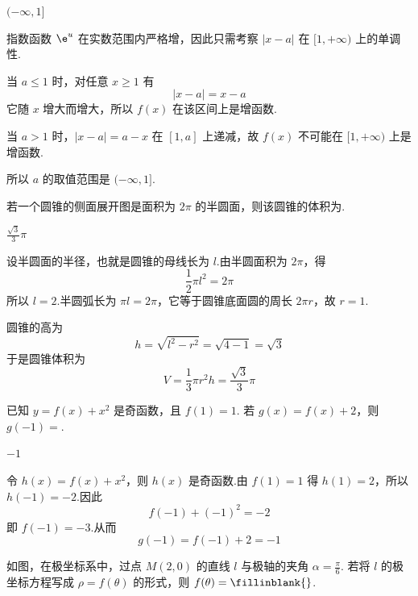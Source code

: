\begin{answer}
\((-\infty,1]\)
\end{answer}

\begin{solution}
指数函数 \(\e^u\) 在实数范围内严格增，因此只需考察 \(|x-a|\) 在 \([1,+\infty)\) 上的单调性.

当 \(a\leqslant1\) 时，对任意 \(x\geqslant1\) 有
\[
|x-a|=x-a
\]
它随 \(x\) 增大而增大，所以 \(f(x)\) 在该区间上是增函数.

当 \(a>1\) 时，\(|x-a|=a-x\) 在 \([1,a]\) 上递减，故 \(f(x)\) 不可能在 \([1,+\infty)\) 上是增函数.

所以 \(a\) 的取值范围是 \((-\infty,1]\).
\end{solution}

\begin{problem}
若一个圆锥的侧面展开图是面积为 \(2\pi\) 的半圆面，则该圆锥的体积为\fillinblank{}.
\end{problem}

\begin{answer}
\(\frac{\sqrt{3}}{3}\pi\)
\end{answer}

\begin{solution}
设半圆面的半径，也就是圆锥的母线长为 \(l\).由半圆面积为 \(2\pi\)，得
\[
\frac12\pi l^2=2\pi
\]
所以 \(l=2\).半圆弧长为 \(\pi l=2\pi\)，它等于圆锥底面圆的周长 \(2\pi r\)，故 \(r=1\).

圆锥的高为
\[
h=\sqrt{l^2-r^2}=\sqrt{4-1}=\sqrt3
\]
于是圆锥体积为
\[
V=\frac13\pi r^2h=\frac{\sqrt3}{3}\pi
\]
\end{solution}

\begin{problem}
已知 \( y = f(x) + x^2 \) 是奇函数，且 \( f(1) = 1 \). 若 \( g(x) = f(x) + 2 \)，则 \( g(-1) = \)\fillinblank{}.
\end{problem}

\begin{answer}
\(-1\)
\end{answer}

\begin{solution}
令 \(h(x)=f(x)+x^2\)，则 \(h(x)\) 是奇函数.由 \(f(1)=1\) 得 \(h(1)=2\)，所以 \(h(-1)=-2\).因此
\[
f(-1)+(-1)^2=-2
\]
即 \(f(-1)=-3\).从而
\[
g(-1)=f(-1)+2=-1
\]
\end{solution}

\begin{problem}
如图，在极坐标系中，过点 \(M(2,0)\) 的直线 \(l\) 与极轴的夹角 \(\alpha = \frac{\pi}{6}\). 若将 \(l\) 的极坐标方程写成 \(\rho = f(\theta)\) 的形式，则 \(f(\theta) =\fillinblank{}\).
\end{problem}

